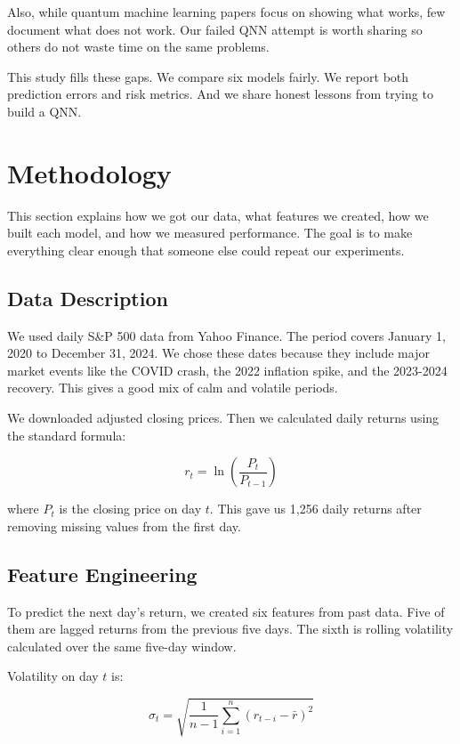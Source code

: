 \documentclass[12pt,a4paper]{article}
\begin{document}
Also, while quantum machine learning papers focus on showing what works, few document what does not work. Our failed QNN attempt is worth sharing so others do not waste time on the same problems.

This study fills these gaps. We compare six models fairly. We report both prediction errors and risk metrics. And we share honest lessons from trying to build a QNN.

\section{Methodology}
This section explains how we got our data, what features we created, how we built each model, and how we measured performance. The goal is to make everything clear enough that someone else could repeat our experiments.

\subsection{Data Description}
We used daily S\&P 500 data from Yahoo Finance. The period covers January 1, 2020 to December 31, 2024. We chose these dates because they include major market events like the COVID crash, the 2022 inflation spike, and the 2023-2024 recovery. This gives a good mix of calm and volatile periods.

We downloaded adjusted closing prices. Then we calculated daily returns using the standard formula:

\begin{equation}
r_t = \ln\left(\frac{P_t}{P_{t-1}}\right)
\end{equation}

where $P_t$ is the closing price on day $t$. This gave us 1,256 daily returns after removing missing values from the first day.

\subsection{Feature Engineering}
To predict the next day's return, we created six features from past data. Five of them are lagged returns from the previous five days. The sixth is rolling volatility calculated over the same five-day window.

Volatility on day $t$ is:

\begin{equation}
\sigma_t = \sqrt{\frac{1}{n-1} \sum_{i=1}^{n} (r_{t-i} - \bar{r})^2}
\end{equation}
\end{document}
